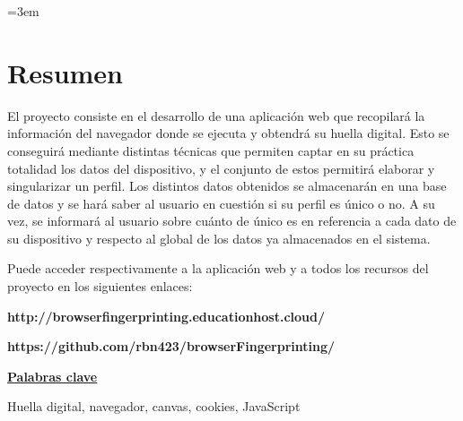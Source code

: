 \parindent=3em
\chapter*{Resumen}

El proyecto consiste en el desarrollo de una aplicación web que recopilará la información del navegador donde se ejecuta y obtendrá su huella digital. Esto se conseguirá mediante distintas técnicas que permiten captar en su práctica totalidad los datos del dispositivo, y el conjunto de estos permitirá elaborar y singularizar un perfil. Los distintos datos obtenidos se almacenarán en una base de datos y se hará saber al usuario en cuestión si su perfil es único o no. A su vez, se informará al usuario sobre cuánto de único es en referencia a cada dato de su dispositivo y respecto al global de los datos ya almacenados en el sistema. \par

\noindent
Puede acceder respectivamente a la aplicación web y a todos los recursos del proyecto en los siguientes enlaces: \par
\textbf{http://browserfingerprinting.educationhost.cloud/} \par

\textbf{https://github.com/rbn423/browserFingerprinting/} \par

\vspace{12mm}
\noindent
\underline{\Large{\textbf{Palabras clave}}}\par
\vspace{7mm}
\noindent
\normalsize{Huella digital, navegador, canvas, cookies, JavaScript}
